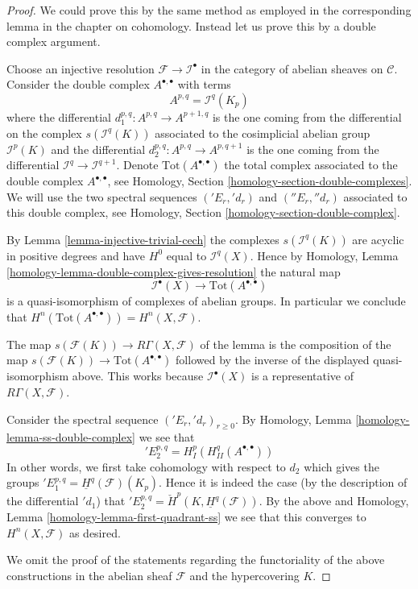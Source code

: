 \begin{proof}
We could prove this by the same method as employed in the corresponding
lemma in the chapter on cohomology. Instead let us prove this by a
double complex argument.

\medskip\noindent
Choose an injective resolution $\mathcal{F} \to \mathcal{I}^\bullet$
in the category of abelian sheaves on $\mathcal{C}$. Consider the
double complex $A^{\bullet, \bullet}$ with terms
$$
A^{p, q} = \mathcal{I}^q(K_p)
$$
where the differential $d_1^{p, q} : A^{p, q} \to A^{p + 1, q}$ is the one
coming from the differential on the complex $s(\mathcal{I}^q(K))$
associated to the cosimplicial abelian group $\mathcal{I}^p(K)$
and the differential $d_2^{p, q} : A^{p, q} \to A^{p, q + 1}$ is the one
coming from the differential $\mathcal{I}^q \to \mathcal{I}^{q + 1}$.
Denote $\text{Tot}(A^{\bullet, \bullet})$ the total complex associated to
the double complex $A^{\bullet, \bullet}$, see
Homology, Section \ref{homology-section-double-complexes}.
We will use the two spectral
sequences $({}'E_r, {}'d_r)$ and $({}''E_r, {}''d_r)$
associated to this double complex, see
Homology, Section \ref{homology-section-double-complex}.

\medskip\noindent
By Lemma \ref{lemma-injective-trivial-cech}
the complexes $s(\mathcal{I}^q(K))$ are acyclic in
positive degrees and have $H^0$ equal to $\mathcal{I}^q(X)$.
Hence by
Homology, Lemma \ref{homology-lemma-double-complex-gives-resolution}
the natural map
$$
\mathcal{I}^\bullet(X) \longrightarrow \text{Tot}(A^{\bullet, \bullet})
$$
is a quasi-isomorphism of complexes of abelian groups. In particular
we conclude that $H^n(\text{Tot}(A^{\bullet, \bullet})) = H^n(X, \mathcal{F})$.

\medskip\noindent
The map $s(\mathcal{F}(K)) \longrightarrow R\Gamma(X, \mathcal{F})$ of
the lemma is the composition of the map
$s(\mathcal{F}(K)) \to \text{Tot}(A^{\bullet, \bullet})$
followed by the inverse
of the displayed quasi-isomorphism above. This works because
$\mathcal{I}^\bullet(X)$ is a representative of $R\Gamma(X, \mathcal{F})$.

\medskip\noindent
Consider the spectral sequence $({}'E_r, {}'d_r)_{r \geq 0}$. By
Homology, Lemma \ref{homology-lemma-ss-double-complex}
we see that
$$
{}'E_2^{p, q} = H^p_I(H^q_{II}(A^{\bullet, \bullet}))
$$
In other words, we first take cohomology with respect to
$d_2$ which gives the groups
${}'E_1^{p, q} = \underline{H}^q(\mathcal{F})(K_p)$.
Hence it is indeed the case (by the description of the differential
${}'d_1$) that
${}'E_2^{p, q} = \check{H}^p(K, \underline{H}^q(\mathcal{F}))$.
By the above and Homology, Lemma \ref{homology-lemma-first-quadrant-ss}
we see that this converges to $H^n(X, \mathcal{F})$ as desired.

\medskip\noindent
We omit the proof of the statements regarding the functoriality of
the above constructions in the abelian sheaf $\mathcal{F}$ and the
hypercovering $K$.
\end{proof}









